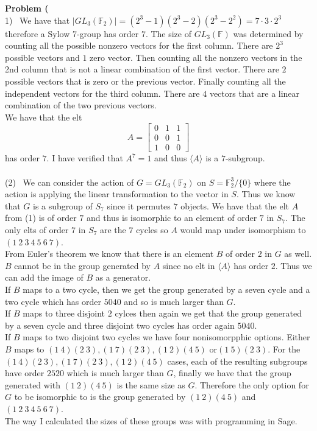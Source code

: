 \documentclass[12pt]{article}
\newenvironment{ques}[1]{\textbf{Problem #1}\vspace{1 mm}\\ }{\bigskip}
\theoremstyle{definition}
\newcommand{\F}{\mathbb F}
\begin{document}
\begin{ques}{1.5}
	(1) \ We have that $|GL_3(\F_2)| = (2^3 - 1)(2^3 - 2)(2^3-2^2)= 7 \cdot 3 
	\cdot 2^3$ therefore a Sylow 7-group has order $7$. The size of $GL_3(\F)$
	was determined by counting all the possible nonzero vectors for the first
	column. There are $2^3$ possible vectors and $1$ zero vector. Then counting
	all the nonzero vectors in the 2nd column that is not
	a linear combination of the first vector. There are $2$ possible vectors
	that is zero or the previous vector. Finally counting all the independent
	vectors for the third column. There are $4$ vectors that are a linear
	combination of the two previous vectors.\\
	We have that the elt
	$$A = \begin{bmatrix}
		0 & 1 & 1 \\
		0 & 0 & 1 \\
		1 & 0 & 0
	\end{bmatrix}$$
	has order $7$. I have verified that $A^7 = 1$ and thus $\langle A \rangle$
	is a $7$-subgroup.\\
\\
	(2) \ We can consider the action of $G = GL_3(\F_2)$ on $S = \F_2^3/\{0\}$
	where the action is applying the linear transformation to the vector in
	$S$. Thus we know that $G$ is a subgroup of $S_7$ since it permutes $7$
	objects. We have that the elt $A$ from (1) is of order $7$ and thus is
	isomorphic to an element of order $7$ in $S_7$. The only elts of order $7$
	in $S_7$ are the $7$ cycles so $A$ would map under isomorphism to $(1\ 2\
	3\ 4\ 5\ 6\ 7)$.\\
	From Euler's theorem we know that there is an element $B$ of order $2$ in
	$G$ as well. $B$ cannot be in the group generated by $A$ since no elt in
	$\langle A \rangle$ has order $2$. Thus we can add the image of $B$ as a
	generator. \\
	If $B$ maps to a two cycle, then we get the group generated by a
	seven cycle and a two cycle which has order $5040$ and so is much larger than
	$G$. \\
	If $B$ maps to three disjoint $2$ cylces then again we get that the
	group generated by a seven cycle and three disjoint two cycles has order
	again $5040$. \\
	If $B$ maps to two disjoint two cycles we
	have four nonisomorpphic options. Either $B$ maps to $(1 \ 4)(2 \ 3), (1 \
	7)(2 \ 3), (1 \ 2)(4 \ 5)$ or$(1 \ 5)(2 \ 3)$. For the $(1 \ 4)(2 \ 3), (1
	\ 7)(2 \ 3), (1 \ 2)(4 \ 5)$ cases, each of the resulting subgroups have
	order $2520$ which is much larger than $G$, finally we have that the group
	generated with $(1 \ 2)(4 \ 5)$ is the same size as $G$. Therefore the only
	option for $G$ to be isomorphic to is the group generated by $(1 \ 2)(4 \
	5)$ and $(1\ 2\ 3\ 4\ 5\ 6\ 7)$. \\
	The way I calculated the sizes of these groups was with programming in Sage.
\end{ques}
\end{document}

